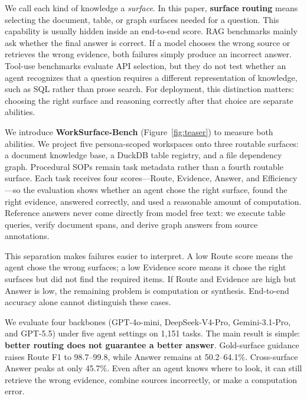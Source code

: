 \documentclass[11pt]{article}
\begin{document}
We call each kind of knowledge a \emph{surface}. In this paper, \textbf{surface
routing} means selecting the document, table, or graph surfaces needed for a
question. This capability is usually hidden inside an end-to-end score. RAG
benchmarks \citep{friel2024ragbench,chen2020hybridqa,chen2021ottqa} mainly ask
whether the final answer is correct. If a model chooses the wrong source or
retrieves the wrong evidence, both failures simply produce an incorrect
answer. Tool-use benchmarks
\citep{huang2023metatool,chen2023teval,li2023apibank} evaluate API selection,
but they do not test whether an agent recognizes that a question requires a
different representation of knowledge, such as SQL rather than prose search.
For deployment, this distinction matters: choosing the right surface and
reasoning correctly after that choice are separate abilities.

We introduce \textbf{WorkSurface-Bench} (Figure~\ref{fig:teaser}) to measure
both abilities. We project five persona-scoped workspaces onto three routable
surfaces: a document knowledge base, a DuckDB table registry, and a file
dependency graph. Procedural SOPs remain task metadata rather than a fourth
routable surface. Each task receives four scores---Route, Evidence, Answer,
and Efficiency---so the evaluation shows whether an agent chose the right
surface, found the right evidence, answered correctly, and used a reasonable
amount of computation. Reference answers never come directly from model free
text: we execute table queries, verify document spans, and derive graph answers
from source annotations.

This separation makes failures easier to interpret. A low Route score means
the agent chose the wrong surfaces; a low Evidence score means it chose the
right surfaces but did not find the required items. If Route and Evidence are
high but Answer is low, the remaining problem is computation or synthesis.
End-to-end accuracy alone cannot distinguish these cases.

We evaluate four backbones (GPT-4o-mini, DeepSeek-V4-Pro, Gemini-3.1-Pro, and
GPT-5.5) under five agent settings on 1{,}151 tasks. The main
result is simple: \textbf{better routing does not guarantee a better answer}.
Gold-surface guidance raises Route F1 to 98.7--99.8, while Answer remains at
50.2--64.1\%. Cross-surface Answer peaks at only 45.7\%. Even after an agent
knows where to look, it can still retrieve the
wrong evidence, combine sources incorrectly, or make a computation error.
\end{document}

